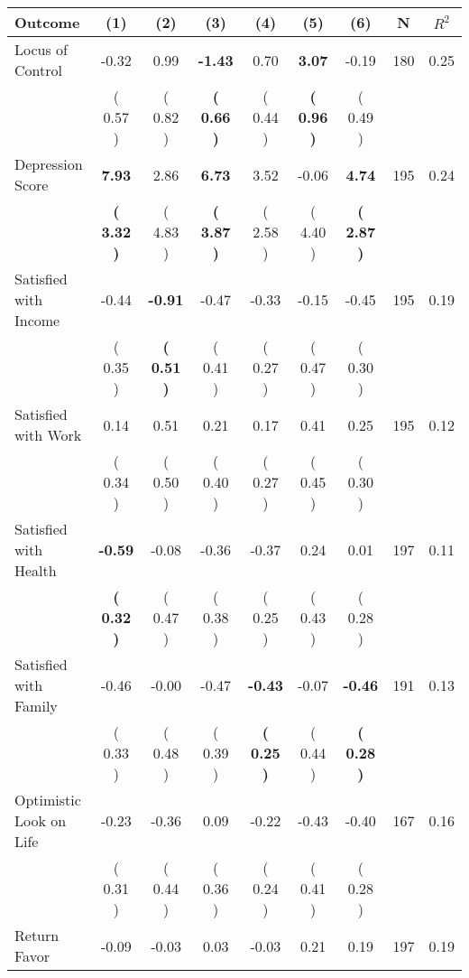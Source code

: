 \begin{tabular}{lcccccccc}
\toprule
 \textbf{Outcome} & \textbf{(1)} & \textbf{(2)} & \textbf{(3)} & \textbf{(4)} & \textbf{(5)} & \textbf{(6)} & \textbf{N} & \textbf{$ R^2$} \\
\midrule
Locus of Control &     -0.32 &      0.99 & \textbf{    -1.43} &      0.70 & \textbf{     3.07} &     -0.19 & 180 &       0.25 \\ 
 & (     0.57 ) & (     0.82 ) & \textbf{(     0.66 )} & (     0.44 ) & \textbf{(     0.96 )} & (     0.49 ) & \\
Depression Score & \textbf{     7.93} &      2.86 & \textbf{     6.73} &      3.52 &     -0.06 & \textbf{     4.74} & 195 &       0.24 \\ 
 & \textbf{(     3.32 )} & (     4.83 ) & \textbf{(     3.87 )} & (     2.58 ) & (     4.40 ) & \textbf{(     2.87 )} & \\
Satisfied with Income &     -0.44 & \textbf{    -0.91} &     -0.47 &     -0.33 &     -0.15 &     -0.45 & 195 &       0.19 \\ 
 & (     0.35 ) & \textbf{(     0.51 )} & (     0.41 ) & (     0.27 ) & (     0.47 ) & (     0.30 ) & \\
Satisfied with Work &      0.14 &      0.51 &      0.21 &      0.17 &      0.41 &      0.25 & 195 &       0.12 \\ 
 & (     0.34 ) & (     0.50 ) & (     0.40 ) & (     0.27 ) & (     0.45 ) & (     0.30 ) & \\
Satisfied with Health & \textbf{    -0.59} &     -0.08 &     -0.36 &     -0.37 &      0.24 &      0.01 & 197 &       0.11 \\ 
 & \textbf{(     0.32 )} & (     0.47 ) & (     0.38 ) & (     0.25 ) & (     0.43 ) & (     0.28 ) & \\
Satisfied with Family &     -0.46 &     -0.00 &     -0.47 & \textbf{    -0.43} &     -0.07 & \textbf{    -0.46} & 191 &       0.13 \\ 
 & (     0.33 ) & (     0.48 ) & (     0.39 ) & \textbf{(     0.25 )} & (     0.44 ) & \textbf{(     0.28 )} & \\
Optimistic Look on Life &     -0.23 &     -0.36 &      0.09 &     -0.22 &     -0.43 &     -0.40 & 167 &       0.16 \\ 
 & (     0.31 ) & (     0.44 ) & (     0.36 ) & (     0.24 ) & (     0.41 ) & (     0.28 ) & \\
Return Favor &     -0.09 &     -0.03 &      0.03 &     -0.03 &      0.21 &      0.19 & 197 &       0.19 \\ 

\end{tabular}
